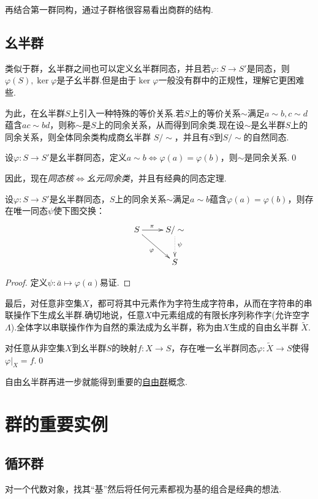 再结合第一群同构，通过子群格很容易看出商群的结构.

\subsection{幺半群}
类似于群，幺半群之间也可以定义{\heiti 幺半群同态}，并且若$\varphi\colon S\to S'$是同态，则$\varphi(S),\ker\varphi$是子幺半群.但是由于$\ker\varphi$一般没有群中的正规性，理解它更困难些.

为此，在幺半群$S$上引入一种特殊的等价关系.若$S$上的等价关系$\sim$满足$a\sim b,c\sim d$蕴含$ac\sim bd$，则称$\sim$是$S$上的{\heiti 同余关系}，从而得到{\heiti 同余类}.现在设$\sim$是幺半群$S$上的同余关系，则全体同余类构成{\heiti 商幺半群} $S/\sim$，并且有$S$到$S/\sim$的{\heiti 自然同态}.
\begin{lemma}
	设$\varphi\colon S\to S'$是幺半群同态，定义$a\sim b\Leftrightarrow\varphi(a)=\varphi(b)$，则$\sim$是同余关系.\qed
\end{lemma}

因此，现在\emph{同态核$\Leftrightarrow$幺元同余类}，并且有经典的同态定理.
\begin{thm}
	设$\varphi\colon S\to S'$是幺半群同态，$S$上的同余关系$\sim$满足$a\sim b$蕴含$\varphi(a)=\varphi(b)$，则存在唯一同态$\psi$使下图交换：
	\[
		\xymatrix{
			S\ar[r]^(0.4)\pi\ar[rd]_\varphi&S/\sim\ar@{.>}[d]^(0.45)\psi\\
			&S
		}
	\]\hypertarget{thm:MonoidHomo}{}
\end{thm}
\begin{proof}
	定义$\psi\colon \bar a\mapsto\varphi(a)$易证.
\end{proof}

最后，对任意非空集$X$，都可将其中元素作为字符生成字符串，从而在字符串的串联操作下生成幺半群.确切地说，任意$X$中元素组成的有限长序列称作{\heiti 字}(允许{\heiti 空字} $\Lambda$).全体字以串联操作作为自然的乘法成为幺半群，称为由$X$生成的{\heiti 自由幺半群} $\widetilde{X}$.
\begin{prop}
	对任意从非空集$X$到幺半群$S$的映射$f\colon X\to S$，存在唯一幺半群同态$\varphi\colon\widetilde{X}\to S$使得$\varphi|_X=f$.\qed\hypertarget{prop:MonoidExtension}{}
\end{prop}

自由幺半群再进一步就能得到重要的\hyperref[section:FreeGroup]{自由群}概念.

\section{群的重要实例}
\subsection{循环群}\label{subsec:cyclic}
对一个代数对象，找其“基”然后将任何元素都视为基的组合是经典的想法.

